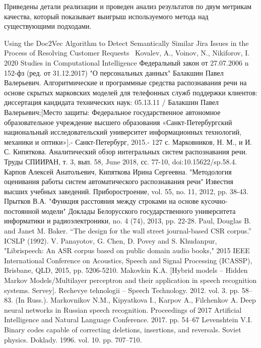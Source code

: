 \documentclass[conference]{IEEEtran}
\begin{document}
Приведены детали реализации и проведен анализ результатов по двум метрикам качества, который показывает выигрыш используемого метода над существующими подходами.


\begin{thebibliography}{00}
 Using the Doc2Vec Algorithm to Detect Semantically Similar Jira Issues in the Process of Resolving Customer Requests  Kovalev, A., Voinov, N., Nikiforov, I. 2020 Studies in Computational Intelligence
 Федеральный закон от 27.07.2006 n 152-фз (ред. от 31.12.2017) "О персональных данных"
 Балакшин Павел Валерьевич. Алгоритмические и программные средства распознавания речи на основе скрытых марковских моделей для телефонных служб поддержки клиентов: диссертация кандидата технических наук: 05.13.11 / Балакшин Павел Валерьевич;[Место защиты: Федеральное государственное автономное образовательное учреждение высшего образования «Санкт-Петербургский национальный исследовательский университет информационных технологий, механики и оптики»].- Санкт-Петербург, 2015.- 127 с.
 Марковников, Н. М., и И. С. Кипяткова. Аналитический обзор интегральных систем распознавания речи. Труды СПИИРАН, т. 3, вып. 58, June 2018, сс. 77-10, doi:10.15622/sp.58.4.
 Карпов Алексей Анатольевич, Кипяткова Ирина Сергеевна. "Методология оценивания работы систем автоматического распознавания речи" Известия высших учебных заведений. Приборостроение, vol. 55, no. 11, 2012, pp. 38-43.
 Прытков В.А. "Функция расстояния между строками на основе кусочно-постоянной модели" Доклады Белорусского государственного университета информатики и радиоэлектроники, no. 4 (74), 2013, pp. 22-28.
 Paul, Douglas B. and Janet M. Baker. “The design for the wall street journal-based CSR corpus.” ICSLP (1992).
 V. Panayotov, G. Chen, D. Povey and S. Khudanpur, "Librispeech: An ASR corpus based on public domain audio books," 2015 IEEE International Conference on Acoustics, Speech and Signal Processing (ICASSP), Brisbane, QLD, 2015, pp. 5206-5210.
 Makovkin K.A. [Hybrid models – Hidden Markov Models/Multilayer perceptron and their application in speech recognition systems. Servey]. Rechevye tehnologii – Speech Technology. 2012. vol. 3. pp. 58–83. (In Russ.).
 Markovnikov N.M., Kipyatkova I., Karpov A., Filchenkov A. Deep neural networks in Russian speech recognition. Proceedings of 2017 Artificial Intelligence and Natural Language Conference. 2017. pp. 54–67
 Levenshtein V.I. Binary codes capable of correcting deletions, insertions, and reversals. Soviet physics. Doklady. 1996. vol. 10. pp. 707–710.

\end{thebibliography}
\end{document}
